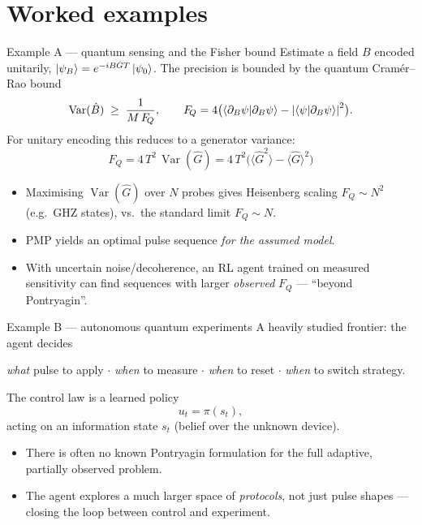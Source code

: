 \documentclass[10pt,aspectratio=169]{beamer}
\newcommand{\FQ}{F_{\!Q}}
\DeclareMathOperator{\Var}{Var}
\begin{document}
\section{Worked examples}

\begin{frame}{Example A --- quantum sensing and the Fisher bound}
  Estimate a field $B$ encoded unitarily, $\ket{\psi_B}=e^{-iB\hat G T}\ket{\psi_0}$.
  The precision is bounded by the \alert{quantum Cram\'er--Rao bound}
  \begin{equation}
    \Var(\hat B) \;\ge\; \frac{1}{M\,\FQ},\qquad
    \FQ = 4\big(\!\braket{\partial_B\psi}{\partial_B\psi} - \abs{\braket{\psi}{\partial_B\psi}}^2\big).
  \end{equation}
  For unitary encoding this reduces to a generator variance:
  \begin{equation}
    \boxed{\;\FQ = 4\,T^2\,\Var(\hat G)
      = 4\,T^2\big(\langle \hat G^2\rangle-\langle \hat G\rangle^2\big)\;}
  \end{equation}
  \begin{itemize}
    \item Maximising $\Var(\hat G)$ over $N$ probes gives Heisenberg scaling
          $\FQ\sim N^2$ (e.g.\ GHZ states), vs.\ the standard limit $\FQ\sim N$.
    \item PMP yields an optimal pulse sequence \emph{for the assumed model}.
    \item With uncertain noise/decoherence, an RL agent trained on measured
          sensitivity can find sequences with larger \emph{observed} $\FQ$ ---
          ``beyond Pontryagin''.
  \end{itemize}
\end{frame}

\begin{frame}{Example B --- autonomous quantum experiments}
  A heavily studied frontier: the agent decides
  \begin{center}
    \emph{what} pulse to apply $\cdot$ \emph{when} to measure $\cdot$
    \emph{when} to reset $\cdot$ \emph{when} to switch strategy.
  \end{center}
  The control law is a learned policy
  \begin{equation}
    u_t = \pi(s_t),
  \end{equation}
  acting on an information state $s_t$ (belief over the unknown device).
  \begin{itemize}
    \item There is often \alert{no known Pontryagin formulation} for the full
          adaptive, partially observed problem.
    \item The agent explores a much larger space of \emph{protocols}, not just
          pulse shapes --- closing the loop between control and experiment.
  \end{itemize}
\end{frame}
\end{document}
